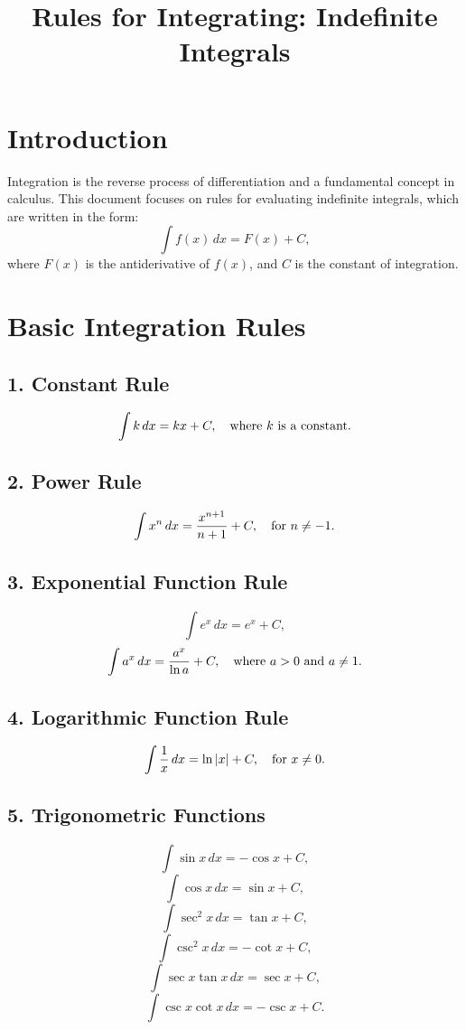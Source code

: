 \documentclass[a4paper,12pt]{article}
\title{Rules for Integrating: Indefinite Integrals}
\author{}
\date{}
\begin{document}
\maketitle

\section*{Introduction}
Integration is the reverse process of differentiation and a fundamental concept in calculus. This document focuses on rules for evaluating indefinite integrals, which are written in the form:
\[
\int f(x) \, dx = F(x) + C,
\]
where \( F(x) \) is the antiderivative of \( f(x) \), and \( C \) is the constant of integration.

\section*{Basic Integration Rules}

\subsection*{1. Constant Rule}
\[
\int k \, dx = kx + C, \quad \text{where \( k \) is a constant.}
\]

\subsection*{2. Power Rule}
\[
\int x^n \, dx = \frac{x^{n+1}}{n+1} + C, \quad \text{for \( n \neq -1 \).}
\]

\subsection*{3. Exponential Function Rule}
\[
\int e^x \, dx = e^x + C,
\]
\[
\int a^x \, dx = \frac{a^x}{\ln a} + C, \quad \text{where \( a > 0 \) and \( a \neq 1 \).}
\]

\subsection*{4. Logarithmic Function Rule}
\[
\int \frac{1}{x} \, dx = \ln|x| + C, \quad \text{for \( x \neq 0 \).}
\]

\subsection*{5. Trigonometric Functions}
\[
\int \sin x \, dx = -\cos x + C,
\]
\[
\int \cos x \, dx = \sin x + C,
\]
\[
\int \sec^2 x \, dx = \tan x + C,
\]
\[
\int \csc^2 x \, dx = -\cot x + C,
\]
\[
\int \sec x \tan x \, dx = \sec x + C,
\]
\[
\int \csc x \cot x \, dx = -\csc x + C.
\]
\end{document}
